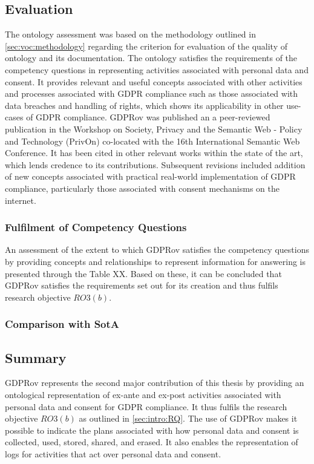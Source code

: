 \subsection{Evaluation}
The ontology assessment was based on the methodology outlined in \autoref{sec:voc:methodology} regarding the criterion for evaluation of the quality of ontology and its documentation.
The ontology satisfies the requirements of the competency questions in representing activities associated with personal data and consent.
It provides relevant and useful concepts associated with other activities and processes associated with GDPR compliance such as those associated with data breaches and handling of rights, which shows its applicability in other use-cases of GDPR compliance.
GDPRov was published \cite{} an a peer-reviewed publication in the Workshop on Society, Privacy and the Semantic Web - Policy and Technology (PrivOn) co-located with the 16th International Semantic Web Conference. It has been cited in other relevant works \cite{} within the state of the art, which lends credence to its contributions.
Subsequent revisions included addition of new concepts associated with practical real-world implementation of GDPR compliance, particularly those associated with consent mechanisms on the internet.

\subsubsection{Fulfilment of Competency Questions}
An assessment of the extent to which GDPRov satisfies the competency questions by providing concepts and relationships to represent information for answering is presented through the Table XX.
Based on these, it can be concluded that GDPRov satisfies the requirements set out for its creation and thus fulfils research objective $RO3(b)$.

\subsubsection{Comparison with SotA}

\subsection*{Summary}
GDPRov represents the second major contribution of this thesis by providing an ontological representation of ex-ante and ex-post activities associated with personal data and consent for GDPR compliance.
It thus fulfils the research objective $RO3(b)$ as outlined in \autoref{sec:intro:RQ}. 
The use of GDPRov makes it possible to indicate the plans associated with how personal data and consent is collected, used, stored, shared, and erased.
It also enables the representation of logs for activities that act over personal data and consent.


